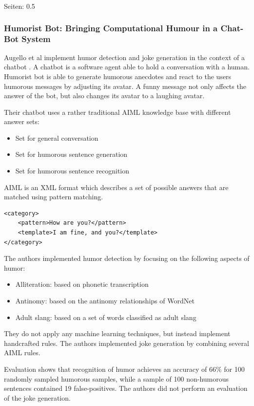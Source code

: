 \documentclass[draft,final,oneside]{vutinfth} %
\begin{document}
\cite{Bamman2015ContextualizedSD}

Seiten: 0.5
\fi

\subsubsection{Humorist Bot: Bringing Computational Humour in a Chat-Bot System}

Augello et al implement humor detection and joke generation in the context of a chatbot \cite{HumoristBot}. A chatbot is a software agent able to hold a conversation with a human. Humorist bot is able to generate humorous anecdotes and react to the users humorous messages by adjusting its avatar. A funny message not only affects the answer of the bot, but also changes its avatar to a laughing avatar.

Their chatbot uses a rather traditional AIML knowledge base with different answer sets:
\begin{itemize}
\item Set for general conversation
\item Set for humorous sentence generation
\item Set for humorous sentence recognition
\end{itemize}

AIML is an XML format which describes a set of possible answers that are matched using pattern matching.

\lstset{language=XML}
\begin{lstlisting}
<category>
    <pattern>How are you?</pattern>
    <template>I am fine, and you?</template>
</category>
\end{lstlisting}

The authors implemented humor detection by focusing on the following aspects of humor: 

\begin{itemize}
\item Alliteration: based on phonetic transcription
\item Antinomy: based on the antinomy relationships of WordNet 
\item Adult slang: based on a set of words classified as adult slang
\end{itemize}

They do not apply any machine learning techniques, but instead implement handcrafted rules. The authors implemented joke generation by combining several AIML rules.

Evaluation shows that recognition of humor achieves an accuracy of 66\% for 100 randomly sampled humorous samples, while a sample of 100 non-humorous sentences contained 19 false-positives. The authors did not perform an evaluation of the joke generation.
\end{document}
